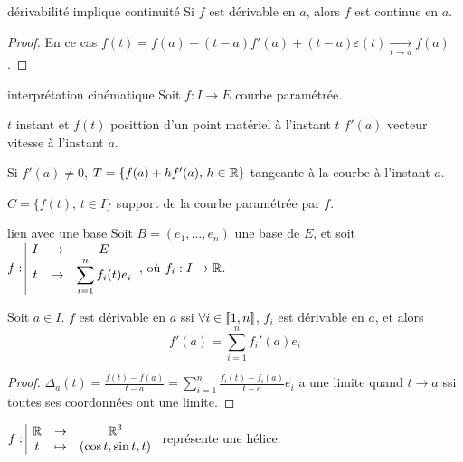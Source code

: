 \begin{corollaire}{dérivabilité implique continuité}{}
    Si $f$ est dérivable en $a$, alors $f$ est continue en $a$.
\end{corollaire}

\begin{proof}
    En ce cas $f(t) = f(a) + (t-a)f'(a) + (t-a)\varepsilon(t) \xrightarrow[t \to a]{} f(a)$.
\end{proof}


\begin{definition}{interprétation cinématique}{}
    Soit $f : I \to E$ courbe paramétrée. 
    
    $t$ instant et $f(t)$ posittion d'un point matériel à l'instant 
    $t$ $f'(a)$ vecteur vitesse à l'instant $a$. 

    Si $f'(a) \neq 0$, $T = \{ f(a) + hf'(a), \, h \in \mathbb{R}\}$ tangeante à la courbe à l'instant 
    $a$. 

    $C = \{ f(t), \, t \in I\}$ support de la courbe paramétrée par $f$. 
\end{definition}

\begin{proposition}{lien avec une base }{}
    Soit $B = (e_1, \ldots, e_n)$ une base de $E$, et soit 
    $\displaystyle f: \space \begin{array}{|ccc} \displaystyle I & \to & \displaystyle E \\ \displaystyle t & \mapsto & \displaystyle \sum_{i=1}^n f_i(t)e_i \end{array}$, où $f_i : I \to \mathbb{R}$.

    Soit $a \in I$. $f$ est dérivable en $a$ ssi $\forall i \in [\![1, n]\!]$, $f_i$
    est dérivable en $a$, et alors 
    $$f'(a) = \sum_{i=1}^n f_i'(a)e_i$$
\end{proposition}

\begin{proof}
    $\Delta_a(t) = \displaystyle \frac{f(t) - f(a)}{t-a} = \sum_{i=1}^n \frac{f_i(t) - f_i(a)}{t-a}e_i$ a 
    une limite quand $t \to a $ ssi toutes ses coordonnées ont une limite.
\end{proof}

\begin{exemple}
    $f: \space \begin{array}{|ccc} \displaystyle \mathbb{R} & \to & \displaystyle \mathbb{R}^3 \\ \displaystyle t & \mapsto & \displaystyle (\cos t, \sin t, t) \end{array}$ représente une hélice.
\end{exemple}

